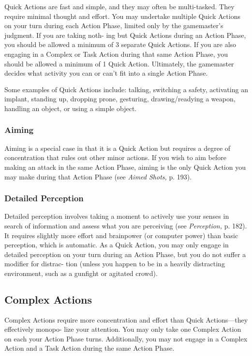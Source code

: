 Quick Actions are fast and simple, and they may often 
be multi-tasked. They require minimal thought and 
effort. You may undertake multiple Quick Actions on 
your turn during each Action Phase, limited only by 
the gamemaster's judgment. If you are taking noth-
ing but Quick Actions during an Action Phase, you 
should be allowed a minimum of 3 separate Quick 
Actions. If you are also engaging in a Complex or Task 
Action during that same Action Phase, you should be 
allowed a minimum of 1 Quick Action. Ultimately, the 
gamemaster decides what activity you can or can't fit 
into a single Action Phase.

Some examples of Quick Actions include: talking, 
switching a safety, activating an implant, standing 
up, dropping prone, gesturing, drawing/readying a 
weapon, handling an object, or using a simple object.

\subsubsection{Aiming}

Aiming is a special case in that it is a Quick Action 
but requires a degree of concentration that rules out 
other minor actions. If you wish to aim before making 
an attack in the same Action Phase, aiming is the only 
Quick Action you may make during that Action Phase 
(see \textit{Aimed Shots,} p. 193).

\subsubsection{Detailed Perception}

Detailed perception involves taking a moment to 
actively use your senses in search of information and 
assess what you are perceiving (see \textit{Perception,} p. 
182). It requires slightly more effort and brainpower 
(or computer power) than basic perception, which is 
automatic. As a Quick Action, you may only engage 
in detailed perception on your turn during an Action 
Phase, but you do not suffer a modifier for distrac-
tion (unless you happen to be in a heavily distracting 
environment, such as a gunfight or agitated crowd).

\subsection{Complex Actions}

Complex Actions require more concentration and 
effort than Quick Actions—they effectively monopo-
lize your attention. You may only take one Complex 
Action on each your Action Phase turns. Additionally, 
you may not engage in a Complex Action and a Task 
Action during the same Action Phase.

